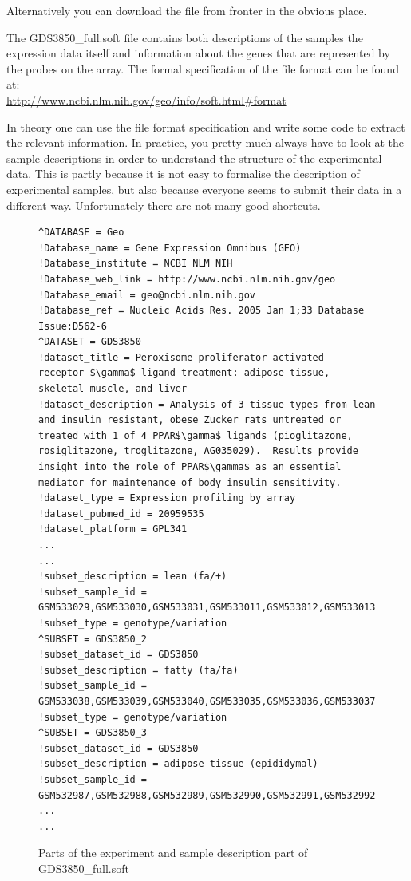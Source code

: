 \documentclass[11pt]{article}
\begin{document}
Alternatively you can download the file from fronter in the obvious place.

The GDS3850\_full.soft file contains both descriptions of the samples
the expression data itself and information about the genes that are
represented by the probes on the array. The formal specification of the
file format can be found at:\\
\url{http://www.ncbi.nlm.nih.gov/geo/info/soft.html#format}

In theory one can use the file format specification and write some code
to extract the relevant information. In practice, you pretty much always
have to look at the sample descriptions in order to understand
the structure of the experimental data. This is partly because it is
not easy to formalise the description of experimental samples, but also
because everyone seems to submit their data in a different way. Unfortunately
there are not many good shortcuts.

\begin{figure}[ht]
\begin{Verbatim}[fontsize=\small]
^DATABASE = Geo
!Database_name = Gene Expression Omnibus (GEO)
!Database_institute = NCBI NLM NIH
!Database_web_link = http://www.ncbi.nlm.nih.gov/geo
!Database_email = geo@ncbi.nlm.nih.gov
!Database_ref = Nucleic Acids Res. 2005 Jan 1;33 Database Issue:D562-6
^DATASET = GDS3850
!dataset_title = Peroxisome proliferator-activated receptor-$\gamma$ ligand treatment: adipose tissue, skeletal muscle, and liver
!dataset_description = Analysis of 3 tissue types from lean and insulin resistant, obese Zucker rats untreated or treated with 1 of 4 PPAR$\gamma$ ligands (pioglitazone, rosiglitazone, troglitazone, AG035029).  Results provide insight into the role of PPAR$\gamma$ as an essential mediator for maintenance of body insulin sensitivity.
!dataset_type = Expression profiling by array
!dataset_pubmed_id = 20959535
!dataset_platform = GPL341
...
...
!subset_description = lean (fa/+)
!subset_sample_id = GSM533029,GSM533030,GSM533031,GSM533011,GSM533012,GSM533013,GSM532993,GSM532994,GSM532995
!subset_type = genotype/variation
^SUBSET = GDS3850_2
!subset_dataset_id = GDS3850
!subset_description = fatty (fa/fa)
!subset_sample_id = GSM533038,GSM533039,GSM533040,GSM533035,GSM533036,GSM533037,GSM533032,GSM533033,GSM533034,GSM533023,GSM533024,GSM533025,GSM533026,GSM533027,GSM533028,GSM533020,GSM533021,GSM533022,GSM533017,GSM533018,GSM533019,GSM533014,GSM533015,GSM533016,GSM533005,GSM533006,GSM533007,GSM533008,GSM533009,GSM533010,GSM533002,GSM533003,GSM533004,GSM532999,GSM533000,GSM533001,GSM532996,GSM532997,GSM532998,GSM532987,GSM532988,GSM532989,GSM532990,GSM532991,GSM532992
!subset_type = genotype/variation
^SUBSET = GDS3850_3
!subset_dataset_id = GDS3850
!subset_description = adipose tissue (epididymal)
!subset_sample_id = GSM532987,GSM532988,GSM532989,GSM532990,GSM532991,GSM532992,GSM532993,GSM532994,GSM532995,GSM532996,GSM532997,GSM532998,GSM532999,GSM533000,GSM533001,GSM533002,GSM533003,GSM533004
...
...  
\end{Verbatim}
\caption{Parts of the experiment and sample description part of GDS3850\_full.soft}
\label{soft1}
\end{figure}
\end{document}

